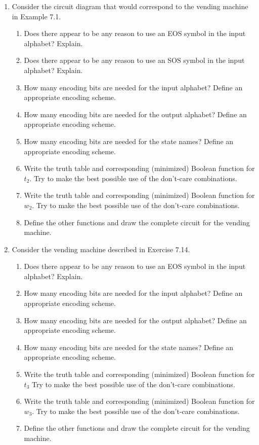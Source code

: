 \begin{enumerate}[{7.}1.]
\item Consider the circuit diagram that would correspond to the vending machine
in Example 7.1.
\begin{enumerate}
\item Does there appear to be any reason to use an \<EOS\> symbol in the input
alphabet? Explain.
\item Does there appear to be any reason to use an \<SOS\> symbol in the input
alphabet? Explain.
\item How many encoding bits are needed for the input alphabet? Define an
appropriate encoding scheme.
\item How many encoding bits are needed for the output alphabet? Define an
appropriate encoding scheme.
\item How many encoding bits are needed for the state names? Define an
appropriate encoding scheme.
\item Write the truth table and corresponding (minimized) Boolean function for
$t_2$. Try to make the best possible use of the don't-care combinations.
\item Write the truth table and corresponding (minimized) Boolean function for
$w_2$. Try to make the best possible use of the don't-care combinations.
\item Define the other functions and draw the complete circuit for the vending
machine.
\end{enumerate}

\item Consider the vending machine described in Exercise 7.14.
\begin{enumerate}
\item Does there appear to be any reason to use an \<EOS\> symbol in the input
alphabet? Explain.
\item How many encoding bits are needed for the input alphabet? Define an
appropriate encoding scheme.
\item How many encoding bits are needed for the output alphabet? Define an
appropriate encoding scheme.
\item How many encoding bits are needed for the state names? Define an
appropriate encoding scheme.
\item Write the truth table and corresponding (minimized) Boolean function for
$t_3$ Try to make the best possible use of the don't-care combinations.
\item Write the truth table and corresponding (minimized) Boolean function for
$w_3$. Try to make the best possible use of the don't-care combinations.
\item Define the other functions and draw the complete circuit for the vending
machine.
\end{enumerate}


\end{enumerate}
